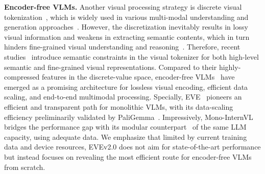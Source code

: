\noindent\textbf{Encoder-free VLMs.} 
Another visual processing strategy is discrete visual tokenization~\cite{van2017VQVAE,VQGAN,LLamagen}, which is widely used in various multi-modal understanding and generation approaches~\cite{team2024chameleon,VLM:AnyGPT,wang2024mio,VLM:EMU3}.
However, the discretization inevitably results in lossy visual information and weakens in extracting semantic contents, which in turn hinders fine-grained visual understanding and reasoning~\cite{xie2024show-o,wu2024janus}.
%
Therefore, recent studies~\cite{wu2024vila-u,li2024imagefolder,qu2024tokenflow,xie2024muse} introduce semantic constraints in the visual tokenizer for both high-level semantic and fine-grained visual representations.
%
Compared to their highly-compressed features in the discrete-value space, encoder-free VLMs~\cite{VLM:Fuyu-8b,VLM:EVE,chen2024solo} have emerged as a promising architecture for lossless visual encoding, efficient data scaling, and end-to-end multimodal processing. 
%
Specially, EVE~\cite{VLM:EVE} pioneers an efficient and transparent path for monolithic VLMs, with its data-scaling efficiency preliminarily validated by PaliGemma~\cite{beyer2024paligemma}. Impressively, Mono-InternVL~\cite{luo2024mono} bridges the performance gap with its modular counterpart~\cite{VLM:InternVL-1.5} of the same LLM capacity, using adequate data. We emphasize that limited by current training data and device resources, EVEv2.0 does not aim for state-of-the-art performance but instead focuses on revealing the most efficient route for encoder-free VLMs from scratch.


